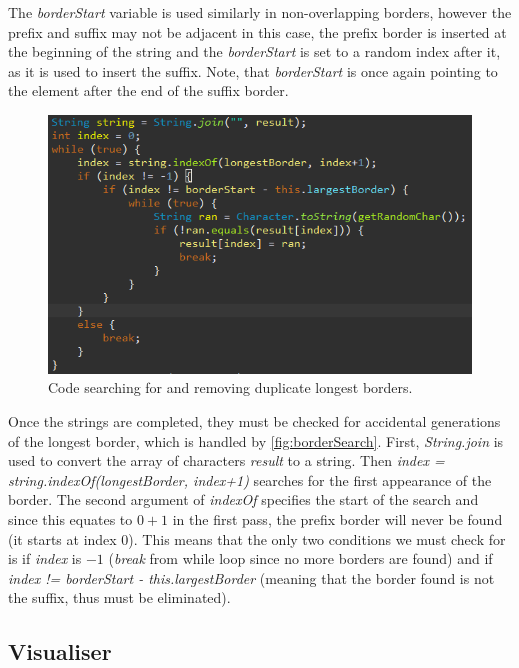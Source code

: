 \documentclass{l4proj}
\begin{document}
The \emph{borderStart} variable is used similarly in non-overlapping borders, however the prefix and suffix may not be adjacent in this case, the prefix border is inserted at the beginning of the string and the \emph{borderStart} is set to a random index after it, as it is used to insert the suffix. Note, that \emph{borderStart} is once again pointing to the element after the end of the suffix border.

\begin{figure}
    \centering
    \includegraphics[width=0.99\linewidth]{images/borderSearch.png}    

    \caption{Code searching for and removing duplicate longest borders.}
    \label{fig:borderSearch} 
\end{figure}

Once the strings are completed, they must be checked for accidental generations of the longest border, which is handled by \autoref{fig:borderSearch}. First, \emph{String.join} is used to convert the array of characters \emph{result} to a string. Then \emph{index = string.indexOf(longestBorder, index+1)} searches for the first appearance of the border. The second argument of \emph{indexOf} specifies the start of the search and since this equates to $0+1$ in the first pass, the prefix border will never be found (it starts at index $0$). This means that the only two conditions we must check for is if \emph{index} is $-1$ (\emph{break} from while loop since no more borders are found) and if \emph{index != borderStart - this.largestBorder} (meaning that the border found is not the suffix, thus must be eliminated).

\subsection{Visualiser}
\end{document}
